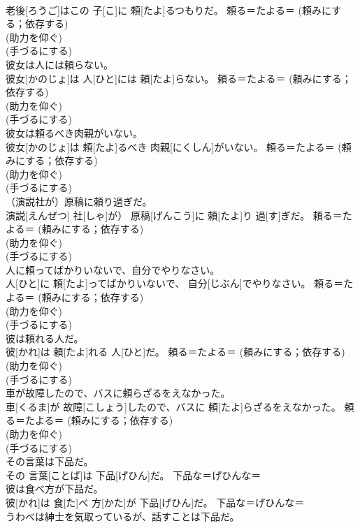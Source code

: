 \documentclass[8pt]{extreport}
\begin{document}
\begin{CJK}{UTF8}{min}
{\\	老後[ろうご]はこの 子[こ]に 頼[たよ]るつもりだ。	頼る＝たよる＝ (頼みにする；依存する) 
\\	(助力を仰ぐ) 
\\	(手づるにする) 
\\	彼女は人には頼らない。	
\\	彼女[かのじょ]は 人[ひと]には 頼[たよ]らない。	頼る＝たよる＝ (頼みにする；依存する) 
\\	(助力を仰ぐ) 
\\	(手づるにする) 
\\	彼女は頼るべき肉親がいない。	
\\	彼女[かのじょ]は 頼[たよ]るべき 肉親[にくしん]がいない。	頼る＝たよる＝ (頼みにする；依存する) 
\\	(助力を仰ぐ) 
\\	(手づるにする) 
\\	（演説社が）原稿に頼り過ぎだ。	
\\	演説[えんぜつ] 社[しゃ]が） 原稿[げんこう]に 頼[たよ]り 過[す]ぎだ。	頼る＝たよる＝ (頼みにする；依存する) 
\\	(助力を仰ぐ) 
\\	(手づるにする) 
\\	人に頼ってばかりいないで、自分でやりなさい。	
\\	人[ひと]に 頼[たよ]ってばかりいないで、 自分[じぶん]でやりなさい。	頼る＝たよる＝ (頼みにする；依存する) 
\\	(助力を仰ぐ) 
\\	(手づるにする) 
\\	彼は頼れる人だ。	
\\	彼[かれ]は 頼[たよ]れる 人[ひと]だ。	頼る＝たよる＝ (頼みにする；依存する) 
\\	(助力を仰ぐ) 
\\	(手づるにする) 
\\	車が故障したので、バスに頼らざるをえなかった。	
\\	車[くるま]が 故障[こしょう]したので、バスに 頼[たよ]らざるをえなかった。	頼る＝たよる＝ (頼みにする；依存する) 
\\	(助力を仰ぐ) 
\\	(手づるにする) 
\\	その言葉は下品だ。	
\\	その 言葉[ことば]は 下品[げひん]だ。	下品な＝げひんな＝ 
\\	彼は食べ方が下品だ。	
\\	彼[かれ]は 食[た]べ 方[かた]が 下品[げひん]だ。	下品な＝げひんな＝ 
\\	うわべは紳士を気取っているが、話すことは下品だ。	
}
\end{CJK}
\end{document}
